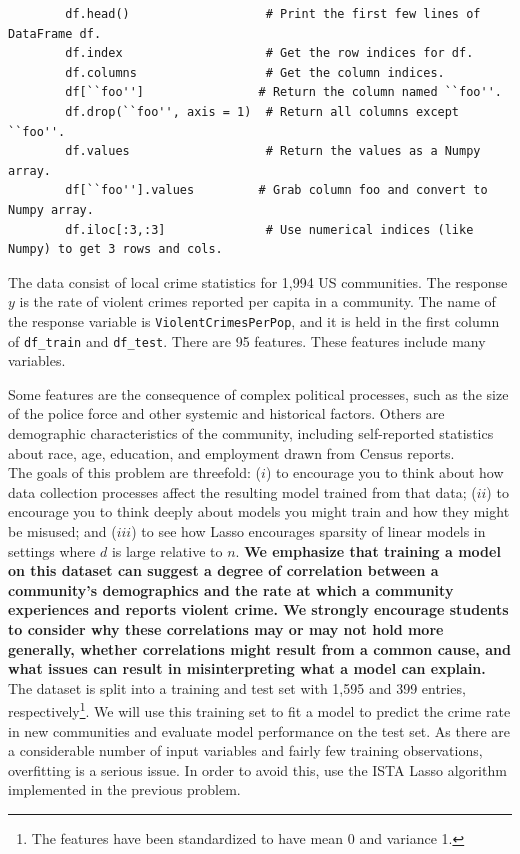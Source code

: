\documentclass{article}
\begin{document}
\begin{sloppypar}
\begin{aprob}
    \begin{verbatim}
        df.head()                   # Print the first few lines of DataFrame df.
        df.index                    # Get the row indices for df.
        df.columns                  # Get the column indices.
        df[``foo'']                # Return the column named ``foo''.
        df.drop(``foo'', axis = 1)  # Return all columns except ``foo''.
        df.values                   # Return the values as a Numpy array.
        df[``foo''].values         # Grab column foo and convert to Numpy array.
        df.iloc[:3,:3]              # Use numerical indices (like Numpy) to get 3 rows and cols.
    \end{verbatim}

    The data consist of local crime statistics for 1,994 US
    communities. The response $y$ is the rate of violent crimes reported per capita in a community. The name of the response variable is \texttt{ViolentCrimesPerPop}, and it is held in the first column of \texttt{df\_train} and \texttt{df\_test}. There are 95 features. These
    features include many variables.
    
    Some features are the consequence of complex political processes, such as the size of the police force and other systemic and historical factors. Others are demographic
    characteristics of the community, including self-reported statistics about race, age, education, and employment drawn from Census reports.\\
    The goals of this problem are threefold: ($i$) to encourage you to think about how data collection processes affect the resulting model trained from that data; ($ii$) to encourage you to think deeply about models you might train and how they might be misused; and ($iii$) to see how Lasso encourages sparsity of linear models in settings where $d$ is large relative to $n$. {\bf We emphasize that training a model on this dataset can suggest a degree of correlation between a community's demographics and the rate at which a community experiences and reports violent crime. We strongly encourage students to consider why these correlations may or may not hold more generally, whether correlations might result from a common cause, and what issues can result in misinterpreting what a model can explain.}\\
    The dataset is split into a training and test set with 1,595 and 399 entries, respectively\footnote{The features have been standardized to have mean 0 and variance 1.}. 
    We will use this training set to fit a model to predict
    the crime rate in new communities and evaluate model performance on the test set.  As there are a considerable number of input variables and fairly few training observations, overfitting is a serious issue.
    In order to avoid this, use the ISTA Lasso algorithm implemented in the previous problem. 


\end{aprob}
\end{sloppypar}
\end{document}
